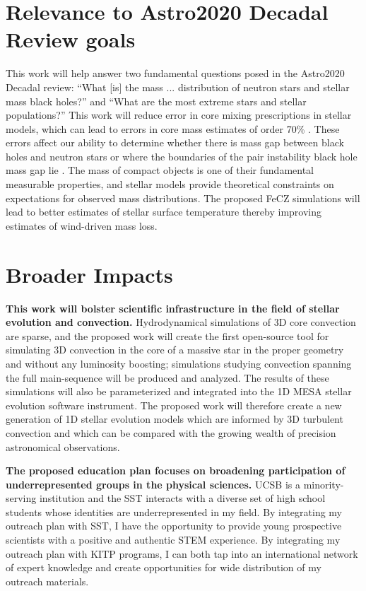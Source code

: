 \documentclass[11pt]{amsart} %
\theoremstyle{definition}
\numberwithin{equation}{section}
\begin{document}
\section{Relevance to Astro2020 Decadal Review goals}

This work will help answer two fundamental questions posed in the Astro2020 Decadal review: ``What [is] the mass ... distribution of neutron stars and stellar mass black holes?'' and ``What are the most extreme stars and stellar populations?''
This work will reduce error in core mixing prescriptions in stellar models, which can lead to errors in core mass estimates of order 70\% \citep{kaiser_etal_2020}.
These errors affect our ability to determine whether there is mass gap between black holes and neutron stars \citep{vanson_etal_2022} or where the boundaries of the pair instability black hole mass gap lie \citep{farmer_etal_2019}.
The mass of compact objects is one of their fundamental measurable properties, and stellar models provide theoretical constraints on expectations for observed mass distributions.
The proposed FeCZ simulations will lead to better estimates of stellar surface temperature thereby improving estimates of wind-driven mass loss.%


\section*{Broader Impacts}

\textbf{This work will bolster scientific infrastructure in the field of stellar evolution and convection.}
Hydrodynamical simulations of 3D core convection are sparse, and the proposed work will create the first open-source tool for simulating 3D convection in the core of a massive star in the proper geometry and without any luminosity boosting; simulations studying convection spanning the full main-sequence will be produced and analyzed.
The results of these simulations will also be parameterized and integrated into the 1D MESA stellar evolution software instrument.
The proposed work will therefore create a new generation of 1D stellar evolution models which are informed by 3D turbulent convection and which can be compared with the growing wealth of precision astronomical observations.

\textbf{The proposed education plan focuses on broadening participation of underrepresented groups in the physical sciences.}
UCSB is a minority-serving institution and the SST interacts with a diverse set of high school students whose identities are underrepresented in my field.
By integrating my outreach plan with SST, I have the opportunity to provide young prospective scientists with a positive and authentic STEM experience.
By integrating my outreach plan with KITP programs, I can both tap into an international network of expert knowledge and create opportunities for wide distribution of my outreach materials.



\vfil\eject

\end{document}
